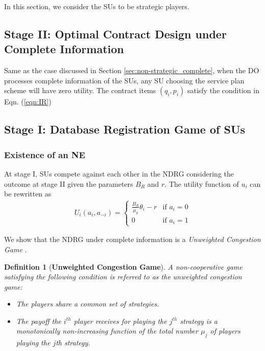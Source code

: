 \documentclass[journal]{IEEEtran}
\newtheorem{definition}{Definition}
\begin{document}
In this section, we consider the SUs to be strategic players.

\subsection{Stage II: Optimal Contract Design under Complete Information}

Same as the case discussed in Section \ref{sec:non-strategic_complete}, when the DO processes complete information of the SUs, any SU choosing the service plan scheme will have zero utility.
The contract items ${(q_i, p_i)}$ satisfy the condition in Eqn. (\ref{eqn:IR})

\subsection{Stage I: Database Registration Game of SUs}

\subsubsection{Existence of an NE}

At stage I, SUs compete against each other in the NDRG considering the outcome at stage II given the parameters $B_R$ and $r$. The utility function of $u_i$ can be rewritten as
\begin{eqnarray}
U_i(a_i, a_{-i})=\left\{
\begin{array}{ll}
\frac{B_R}{\mu_0}\theta_i-r & \textrm{if $a_i=0$} \\
0 & \textrm{if $a_i=1$}
\end{array}
\right. \label{eqn:u_complete_info}
\end{eqnarray}

We show that the NDRG under complete information is a \emph{Unweighted Congestion Game} \cite{congestion_game}.
\begin{definition}[\textbf{Unweighted Congestion Game}]
A non-cooperative game satisfying the following condition is referred to as the unweighted congestion game:
\begin{itemize}
  \item The players share a common set of strategies.
  \item The payoff the $i^{th}$ player receives for playing the $j^{th}$ strategy is a monotonically non-increasing function of the total number $\mu_j$ of players playing the $j$th strategy.
\end{itemize}
\end{definition}
\end{document}
